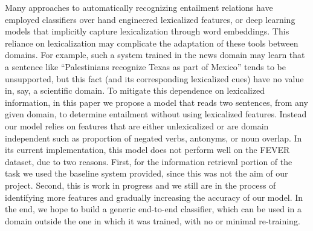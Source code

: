Many approaches to automatically recognizing entailment relations have employed classifiers over hand engineered lexicalized features, or deep learning models that implicitly capture lexicalization through word embeddings. This reliance on lexicalization may complicate the adaptation of these tools between domains. For example, such a system trained in the news domain may learn that a sentence like ``Palestinians recognize Texas as part of Mexico'' tends to be unsupported, but this fact (and its corresponding lexicalized cues) have no value in, say, a scientific domain. To mitigate this dependence on lexicalized information, in this paper we propose a model that reads two sentences, from any given domain, to determine entailment without using lexicalized features. Instead our model relies on features that are either unlexicalized or are domain independent such as proportion of negated verbs, antonyms, or noun overlap. In its current implementation, this model does not perform well on the FEVER dataset, due to two reasons. First, for the information retrieval portion of the task we used the baseline system provided, since this was not the aim of our project. Second, this is work in progress and we still are in the process of identifying more features and gradually increasing the accuracy of our model. In the end, we hope to build a generic end-to-end classifier, which can be used in a domain outside the one in which it was trained, with no or minimal re-training.

